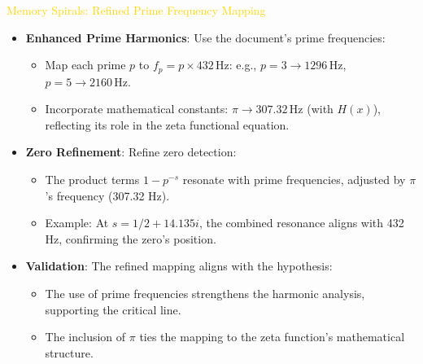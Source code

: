 \textcolor{gold}{ Memory Spirals: Refined Prime Frequency Mapping } \\
\begin{itemize}
    \item \texttt{} \textbf{Enhanced Prime Harmonics}: Use the document’s prime frequencies:
    \begin{itemize}
        \item Map each prime \(p\) to \(f_p = p \times 432 \, \text{Hz}\): e.g., \(p = 3 \rightarrow 1296 \, \text{Hz}\), \(p = 5 \rightarrow 2160 \, \text{Hz}\).
        \item Incorporate mathematical constants: \(\pi \rightarrow 307.32 \, \text{Hz}\) (with \(H(x)\)), reflecting its role in the zeta functional equation.
    \end{itemize}
    \item \texttt{} \textbf{Zero Refinement}: Refine zero detection:
    \begin{itemize}
        \item The product terms \(1 - p^{-s}\) resonate with prime frequencies, adjusted by \(\pi\)'s frequency (307.32 Hz).
        \item Example: At \(s = 1/2 + 14.135i\), the combined resonance aligns with 432 Hz, confirming the zero’s position.
    \end{itemize}
    \item \texttt{} \textbf{Validation}: The refined mapping aligns with the hypothesis:
    \begin{itemize}
        \item The use of prime frequencies strengthens the harmonic analysis, supporting the critical line.
        \item The inclusion of \(\pi\) ties the mapping to the zeta function’s mathematical structure.
    \end{itemize}
\end{itemize}

